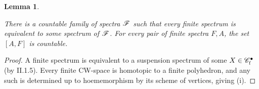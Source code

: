 \documentclass[11pt]{article}
\theoremstyle{plain}
\newtheorem{lem}[thm]{Lemma}
\newtheorem{sublem}[thm]{Sublemma}
\theoremstyle{definition}
\newcommand{\CWf}{\scrC_\textup{f}}
\begin{document}
{%
\setcounter{thm}{15}
\begin{lem}\hfil
\begin{itemise}
\itm[(i)]There is a countable family of spectra $\mathscr{F}$ such that every finite
spectrum is equivalent to some spectrum of $\mathscr{F}$.
\itm[(ii)]For every pair of finite spectra $F,A$, the set $[A,F]$ is countable.
\end{itemise}
\end{lem}
\begin{proof}
A finite spectrum is equivalent to a suspension spectrum of some
$X\in\CWf^\bullet$ (by II.1.5). Every finite CW-space is homotopic to a finite
polyhedron, and any such is determined up to hoememorphism by its scheme of
vertices, giving (i).


\end{proof}}
\end{document}
